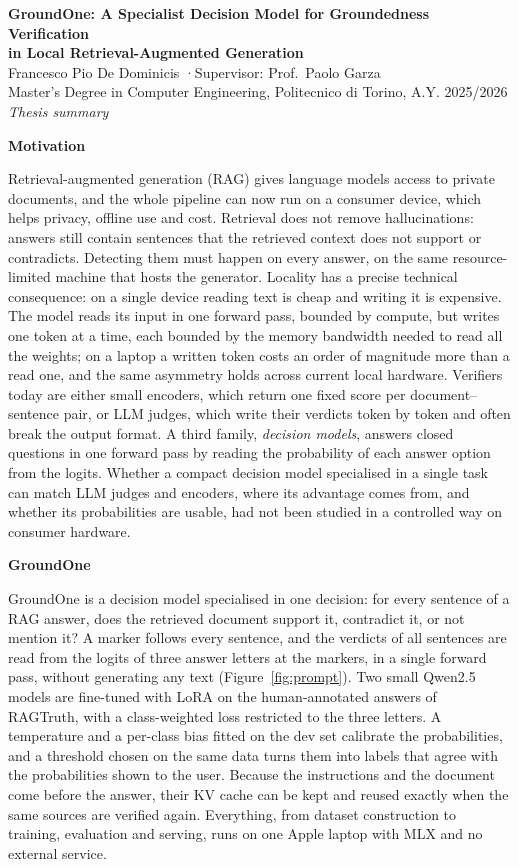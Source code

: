 \documentclass[11pt,a4paper]{article}
\newcommand{\sect}[1]{\par\medskip\noindent\textbf{\large #1}\par\smallskip}
\begin{document}
\begin{center}
{\Large\bfseries GroundOne: A Specialist Decision Model for Groundedness Verification\\ in Local Retrieval-Augmented Generation}\\[6pt]
{\normalsize Francesco Pio De Dominicis \quad·\quad Supervisor: Prof.\ Paolo Garza\\
Master's Degree in Computer Engineering, Politecnico di Torino, A.Y. 2025/2026}\\[4pt]
\textit{Thesis summary}
\end{center}

\sect{Motivation}
Retrieval-augmented generation (RAG) gives language models access to private documents, and the whole pipeline can now
run on a consumer device, which helps privacy, offline use and cost. Retrieval does not remove hallucinations: answers
still contain sentences that the retrieved context does not support or contradicts. Detecting them must happen on every
answer, on the same resource-limited machine that hosts the generator. Locality has a precise technical consequence: on
a single device reading text is cheap and writing it is expensive. The model reads its input in one forward pass,
bounded by compute, but writes one token at a time, each bounded by the memory bandwidth needed to read all the weights;
on a laptop a written token costs an order of magnitude more than a read one, and the same asymmetry holds across current
local hardware. Verifiers today are either small encoders, which return one fixed score per document–sentence pair, or
LLM judges, which write their verdicts token by token and often break the output format. A third family,
\emph{decision models}, answers closed questions in one forward pass by reading the probability of each answer option
from the logits. Whether a compact decision model specialised in a single task can match LLM judges and encoders, where
its advantage comes from, and whether its probabilities are usable, had not been studied in a controlled way on consumer
hardware.

\sect{GroundOne}
GroundOne is a decision model specialised in one decision: for every sentence of a RAG answer, does the retrieved document
support it, contradict it, or not mention it? A marker follows every sentence, and the verdicts of all sentences are read
from the logits of three answer letters at the markers, in a single forward pass, without generating any text
(Figure~\ref{fig:prompt}). Two small Qwen2.5 models are fine-tuned with LoRA on the human-annotated answers of RAGTruth,
with a class-weighted loss restricted to the three letters. A temperature and a per-class bias fitted on the dev set
calibrate the probabilities, and a threshold chosen on the same data turns them into labels that agree with the
probabilities shown to the user. Because the instructions and the document come before the answer, their KV cache can be
kept and reused exactly when the same sources are verified again. Everything, from dataset construction to training,
evaluation and serving, runs on one Apple laptop with MLX and no external service.
\end{document}
